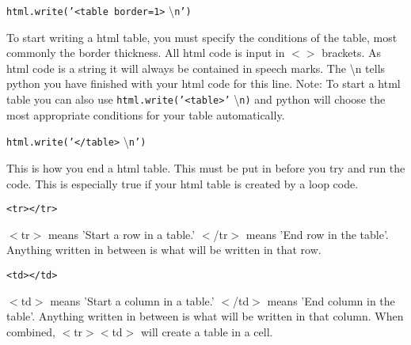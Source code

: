 \noindent \texttt{html.write('<table border=1>} \textbackslash\texttt{n')}
\begin{myindentpar}{1.4cm}
\vspace*{-1ex}
To start writing a html table, you must specify the conditions of the table, most commonly the border thickness. All html code is input in $<>$ brackets. As html code is a string it will always be contained in speech marks. The \textbackslash n tells python you have finished with your html code for this line. Note: To start a html table you can also use \texttt{html.write('<table>'} \textbackslash\texttt{n)} and python will choose the most appropriate conditions for your table automatically.
\end{myindentpar}

\noindent \texttt{html.write('</table>} \textbackslash\texttt{n')}
\begin{myindentpar}{1.4cm}
\vspace*{-1ex}
This is how you end a html table. This must be put in before you try and run the code. This is especially true if your html table is created by a loop code.
\end{myindentpar}

\noindent \texttt{<tr>\lfill </tr>}
\begin{myindentpar}{1.4cm}
\vspace*{-1ex}
$<$tr$>$ means 'Start a row in a table.' $<$/tr$>$ means 'End row in the table'. Anything written in between is what will be written in that row.
\end{myindentpar}

\noindent \texttt{<td>\lfill </td>}
\begin{myindentpar}{1.4cm}
\vspace*{-1ex}
$<$td$>$ means 'Start a column in a table.' $<$/td$>$ means 'End column in the table'. Anything written in between is what will be written in that column. When combined, $<$tr$><$td$>$ will create a table in a cell.
\end{myindentpar}

